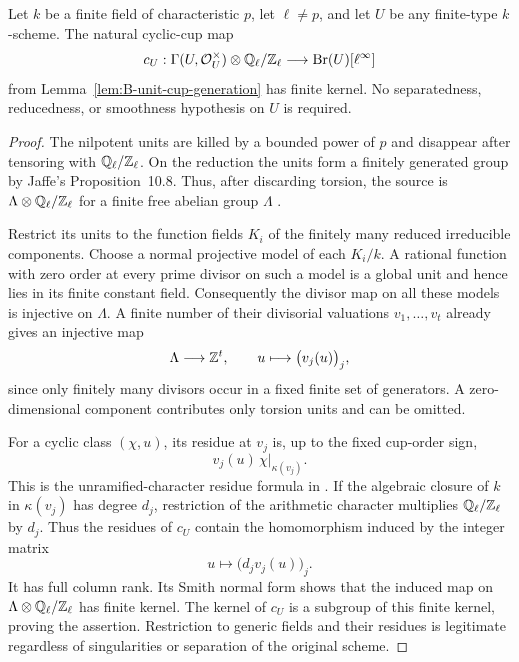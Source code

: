 \begin{lemma}
\label{lem:B-unit-cup-kernel}
Let \(k\) be a finite field of characteristic \(p\), let
\(\ell\ne p\), and let \(U\) be any finite-type
\(k\)-scheme.  The natural cyclic-cup map
\[
 c_U:\Gamma(U,\mathcal O_U^\times)\otimes
                 \mathbb Q_\ell/\mathbb Z_\ell
       \longrightarrow\operatorname{Br}(U)[\ell^\infty]
\]
from Lemma~\ref{lem:B-unit-cup-generation} has finite kernel.
No separatedness, reducedness, or smoothness hypothesis on
\(U\) is required.
\end{lemma}
\begin{proof}
The nilpotent units are killed by a bounded power of \(p\)
and disappear after tensoring with \(\mathbb Q_\ell/\mathbb Z_\ell\).
On the reduction the units form a finitely generated group by
Jaffe's Proposition~10.8.  Thus, after discarding torsion,
the source is \(\Lambda\otimes\mathbb Q_\ell/\mathbb Z_\ell\) for
a finite free abelian group \(\Lambda\)
\cite[Proposition~10.8]{BJaffe1994}.

Restrict its units to the function fields \(K_i\) of the
finitely many reduced irreducible components.  Choose a normal
projective model of each \(K_i/k\).  A rational function
with zero order at every prime divisor on such a model is a
global unit and hence lies in its finite constant field.
Consequently the divisor map on all these models is injective
on \(\Lambda\).  A finite number of their divisorial
valuations \(v_1,\ldots,v_t\) already gives an injective
map
\[
 \Lambda\longrightarrow\mathbb Z^t,
 \qquad u\longmapsto\bigl(v_j(u)\bigr)_j,
\]
since only finitely many divisors occur in a fixed finite set
of generators.  A zero-dimensional component contributes only
torsion units and can be omitted.

For a cyclic class \((\chi,u)\), its residue at \(v_j\)
is, up to the fixed cup-order sign,
\[
       v_j(u)\,\chi|_{\kappa(v_j)}.
\]
This is the unramified-character residue formula in
\citet[section~1.4.1, Proposition~1.4.5 and the cup-residue
formula immediately following it, author-draft p.~37]
       {DCTSkorobogatov2019}.
If the algebraic closure of \(k\) in \(\kappa(v_j)\)
has degree \(d_j\), restriction of the arithmetic character
multiplies \(\mathbb Q_\ell/\mathbb Z_\ell\) by \(d_j\).
Thus the residues of \(c_U\) contain the homomorphism
induced by the integer matrix
\[
             u\longmapsto\bigl(d_jv_j(u)\bigr)_j.
\]
It has full column rank.  Its Smith normal form shows that
the induced map on \(\Lambda\otimes\mathbb Q_\ell/\mathbb Z_\ell\)
has finite kernel.  The kernel of \(c_U\) is a subgroup of
this finite kernel, proving the assertion.  Restriction to
generic fields and their residues is legitimate regardless
of singularities or separation of the original scheme.
\end{proof}

